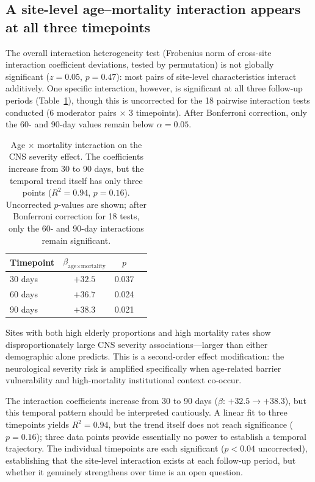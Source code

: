 \documentclass{article}
\begin{document}
\subsection{A site-level age--mortality interaction appears at all three timepoints}

The overall interaction heterogeneity test (Frobenius norm of cross-site interaction coefficient deviations, tested by permutation) is not globally significant ($z = 0.05$, $p = 0.47$): most pairs of site-level characteristics interact additively.
One specific interaction, however, is significant at all three follow-up periods (Table~\ref{tab:interaction}), though this is uncorrected for the 18 pairwise interaction tests conducted (6 moderator pairs $\times$ 3 timepoints).  After Bonferroni correction, only the 60- and 90-day values remain below $\alpha = 0.05$.

\begin{table}[t]
\centering
\caption{Age $\times$ mortality interaction on the CNS severity effect. The coefficients increase from 30 to 90 days, but the temporal trend itself has only three points ($R^2 = 0.94$, $p = 0.16$). Uncorrected $p$-values are shown; after Bonferroni correction for 18 tests, only the 60- and 90-day interactions remain significant.}
\label{tab:interaction}
\begin{tabular}{lccc}
\toprule
Timepoint & $\beta_{\text{age} \times \text{mortality}}$ & $p$ \\
\midrule
30 days  & $+32.5$ & 0.037 \\
60 days  & $+36.7$ & 0.024 \\
90 days  & $+38.3$ & 0.021 \\
\bottomrule
\end{tabular}
\end{table}

Sites with both high elderly proportions and high mortality rates show disproportionately large CNS severity associations---larger than either demographic alone predicts.
This is a second-order effect modification: the neurological severity risk is amplified specifically when age-related barrier vulnerability and high-mortality institutional context co-occur.

The interaction coefficients increase from 30 to 90 days ($\beta$: $+32.5 \to +38.3$), but this temporal pattern should be interpreted cautiously.
A linear fit to three timepoints yields $R^2 = 0.94$, but the trend itself does not reach significance ($p = 0.16$); three data points provide essentially no power to establish a temporal trajectory.
The individual timepoints are each significant ($p < 0.04$ uncorrected), establishing that the site-level interaction exists at each follow-up period, but whether it genuinely strengthens over time is an open question.
\end{document}

